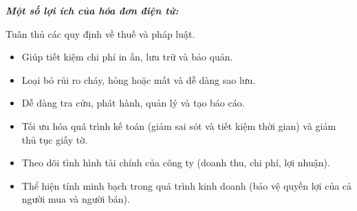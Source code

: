 \textbf{\textit{Một số lợi ích của hóa đơn điện tử:}}

\item Tuân thủ các quy định về thuế và pháp luật.
\begin{itemize}

\item Giúp tiết kiệm chi phí in ấn, lưu trữ và bảo quản.

\item Loại bỏ rủi ro cháy, hỏng hoặc mất và dễ dàng sao lưu.

\item Dễ dàng   tra cứu, phát hành, quản lý và tạo báo cáo.

\item Tối ưu hóa quá trình kế toán (giảm sai sót và tiết kiệm thời gian) và giảm thủ tục giấy tờ.

\item Theo dõi tình hình tài chính của công ty (doanh thu, chi phí, lợi nhuận).


\item Thể hiện tính minh bạch trong quá trình kinh doanh (bảo vệ quyền lợi của cả người mua và người bán).

\end{itemize}

